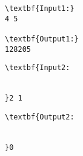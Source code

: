 \begin{verbatim}
\textbf{Input1:}
4 5

\textbf{Output1:}
128205\end{verbatim}
\begin{verbatim}
\textbf{Input2:


}2 1\end{verbatim}
\begin{verbatim}
\textbf{Output2:


}0\end{verbatim}